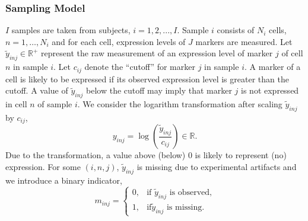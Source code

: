 \documentclass[12pt,]{article}
\providecommand{\tightlist}{%
  \setlength{\itemsep}{0pt}\setlength{\parskip}{0pt}}
\newcommand{\p}[1]{\left(#1\right)}
\begin{document}
\subsubsection{Sampling Model} 

$I$ samples are taken from subjects, \(i = 1,2,...,I\). Sample \(i\) consists
of \(N_i\) cells, \(n=1, \ldots, N_i\) and for each cell, expression levels of
\(J\) markers are measured. Let \(\tilde{y}_{inj} \in \mathbb{R}^+\) represent
the raw measurement of an expression level of marker \(j\) of cell \(n\) in
sample \(i\). Let \(c_{ij}\) denote the ``cutoff'' for marker \(j\) in sample
\(i\). A marker of a cell is likely to be expressed if its observed expression
level is greater than the cutoff. A value of $\tilde{y}_{inj}$ below the cutoff
may imply that marker $j$ is not expressed in cell $n$ of sample $i$.    We
consider the logarithm transformation after scaling \(\tilde{y}_{inj}\) by
\(c_{ij}\), \[ y_{inj}=\log\p{\frac{\tilde{y}_{inj}}{c_{ij}}} \in \mathbb{R}.
\] Due to the transformation, a value above (below) 0 is likely to represent
(no) expression. For some \((i, n, j)\), \(\tilde{y}_{inj}\) is missing due to
experimental artifacts and we introduce a binary indicator, \[ m_{inj} =
\begin{cases} 0, & \text{if $\tilde{y}_{inj}$ is observed,} \\ 1, & \text{if
$\tilde{y}_{inj}$ is missing.} \end{cases} \]


\def\labelenumi{\arabic{enumi}.}

\end{document}
